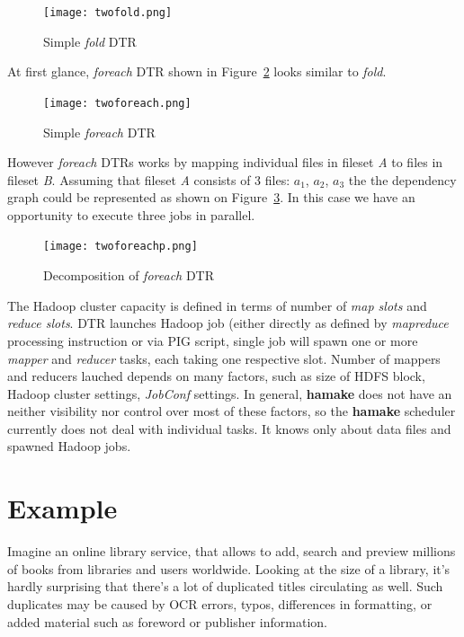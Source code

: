 \documentclass[10pt,conference,letterpaper]{IEEEtran}
\begin{document}
\begin{figure}[htp]
\centering
\texttt{[image: twofold.png]}
\caption{Simple \emph{fold} DTR}
\label{fig:fold1}
\end{figure}

At first glance, \emph{foreach} DTR shown in Figure~\ref{fig:foreach1}
looks similar to \emph{fold}.

\begin{figure}[htp]
\centering
\texttt{[image: twoforeach.png]}
\caption{Simple \emph{foreach} DTR}
\label{fig:foreach1}
\end{figure}

However \emph{foreach} DTRs works by mapping individual files in
fileset \textit{A} to files in fileset \textit{B}. Assuming that
fileset \textit{A} consists of 3 files: \textit{$a_1$},
\textit{$a_2$}, \textit{$a_3$} the the dependency graph could be
represented as shown on Figure~\ref{fig:foreach2}. In this case we
have an opportunity to execute three jobs in parallel.

\begin{figure}[htp]
\centering
\texttt{[image: twoforeachp.png]}
\caption{Decomposition of \emph{foreach} DTR}
\label{fig:foreach2}
\end{figure}

The Hadoop cluster capacity is defined in terms of number of
\textit{map slots} and \textit{reduce slots}. DTR launches Hadoop job
(either directly as defined by \emph{mapreduce} processing instruction
or via PIG script, single job will spawn one or more \emph{mapper} and
\emph{reducer} tasks, each taking one respective slot. Number of
mappers and reducers lauched depends on many factors, such as size of
HDFS block, Hadoop cluster settings, \emph{JobConf} settings. In
general, \textbf{hamake} does not have an neither visibility nor
control over most of these factors, so the \textbf{hamake} scheduler
currently does not deal with individual tasks. It knows only about
data files and spawned Hadoop jobs.

\section{Example}

Imagine an online library service, that allows to add, search and
preview millions of books from libraries and users worldwide. Looking
at the size of a library, it's hardly surprising that there's a lot of
duplicated titles circulating as well. Such duplicates may be caused
by OCR errors, typos, differences in formatting, or added material such as
foreword or publisher information.
\end{document}
